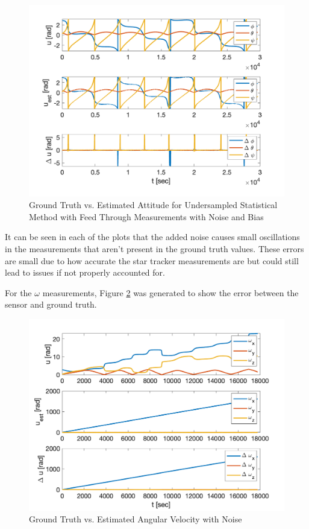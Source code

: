 \begin{figure}[H]
    \centering
    \captionsetup{ justification = centering }
    \includegraphics[width = 12cm]{Images/PS7/attitude_estimation_undersampled_q_default.png}
    \caption{Ground Truth vs. Estimated Attitude for Undersampled Statistical Method with Feed Through Measurements with Noise and Bias}
    \label{fig:stat_attitude_undersampled_default_noise}
\end{figure}

It can be seen in each of the plots that the added noise causes small oscillations in the measurements that aren't present in the ground truth values. These errors are small due to how accurate the star tracker measurements are but could still lead to issues if not properly accounted for.

For the $\omega$ measurements, Figure \ref{fig:omega_noise} was generated to show the error between the sensor and ground truth.

\begin{figure}[H]
    \centering
    \captionsetup{ justification = centering }
    \includegraphics[width = 12cm]{Images/PS7/obcVsGroundOmegas.png}
    \caption{Ground Truth vs. Estimated Angular Velocity with Noise}
    \label{fig:omega_noise}
\end{figure}

